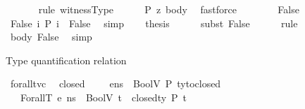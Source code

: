 \begin{isabellebody}
\ \ \ \ \ \isamarkupfalse%
\ {\isacharparenleft}{\kern0pt}rule\ witnessType{\isacharparenright}{\kern0pt}\isanewline
\ \ \ \ \isamarkupfalse%
\ {\isacartoucheopen}P\ z{\isacartoucheclose}\ body\ \isamarkupfalse%
\ fastforce\ \ \ \ \isanewline
{}\isamarkupfalse%
\isanewline
\ \ \isamarkupfalse%
\ False\isanewline
\ \ \isamarkupfalse%
\ False{}{\isacharcolon}{\kern0pt}\ {\isachardoublequoteopen}{\isacharparenleft}{\kern0pt}{\isasymexists}i{\isachardot}{\kern0pt}\ P\ i{\isacharparenright}{\kern0pt}\ {\isacharequal}{\kern0pt}\ False{\isachardoublequoteclose}\ \isamarkupfalse%
\ simp\isanewline
\ \ \isamarkupfalse%
\ {\isacharquery}{\kern0pt}thesis\isanewline
\ \ \ \ \isamarkupfalse%
\ {\isacharparenleft}{\kern0pt}subst\ False{}{\isacharparenright}{\kern0pt}\isanewline
\ \ \ \ \isamarkupfalse%
\ rule\isanewline
\ \ \ \ \isamarkupfalse%
\ body\ False\ \isamarkupfalse%
\ simp\isanewline
{}\isamarkupfalse%
%
\endisatagproof
{\isafoldproof}%
%
\isadelimproof
%
\endisadelimproof
%
\begin{isamarkuptext}%
Type quantification relation%
\end{isamarkuptext}\isamarkuptrue%
\isamarkupfalse%
\ forallt{\isacharunderscore}{\kern0pt}vc{\isacharcolon}{\kern0pt}\isanewline
{}\ {\isachardoublequoteopen}{\isasymAnd}{\isasymtau}{\isachardot}{\kern0pt}\ closed\ {\isasymtau}\ {\isasymLongrightarrow}\ {\isasymLambda}{\isacharcomma}{\kern0pt}{\isasymGamma}{\isacharcomma}{\kern0pt}{\isasymtau}{\isacharhash}{\kern0pt}{\isasymOmega}\ {\isasymturnstile}\ {\isasymlangle}e{\isacharcomma}{\kern0pt}ns{\isasymrangle}\ {\isasymDown}\ BoolV\ {\isacharparenleft}{\kern0pt}P\ {\isacharparenleft}{\kern0pt}ty{\isacharunderscore}{\kern0pt}to{\isacharunderscore}{\kern0pt}closed\ {\isasymtau}{\isacharparenright}{\kern0pt}{\isacharparenright}{\kern0pt}{\isachardoublequoteclose}\isanewline
{}\ {\isachardoublequoteopen}{\isasymLambda}{\isacharcomma}{\kern0pt}{\isasymGamma}{\isacharcomma}{\kern0pt}{\isasymOmega}\ {\isasymturnstile}\ {\isasymlangle}ForallT\ e{\isacharcomma}{\kern0pt}\ ns{\isasymrangle}\ {\isasymDown}\ BoolV\ {\isacharparenleft}{\kern0pt}{\isasymforall}t\ {\isacharcolon}{\kern0pt}{\isacharcolon}{\kern0pt}\ closed{\isacharunderscore}{\kern0pt}ty{\isachardot}{\kern0pt}\ P\ t{\isacharparenright}{\kern0pt}{\isachardoublequoteclose}\isanewline

\end{isabellebody}
